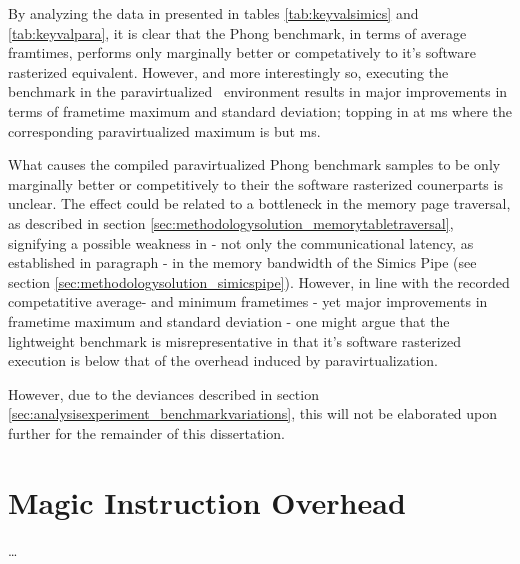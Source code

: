 
By analyzing the data in presented in tables \ref{tab:keyvalsimics} and \ref{tab:keyvalpara}, it is clear that the Phong benchmark, in terms of average framtimes, performs only marginally better or competatively to it's software rasterized equivalent.
However, and more interestingly so, executing the benchmark in the paravirtualized \dvttermsimics\ environment results in major improvements in terms of frametime maximum and standard deviation; topping in at  ms where the corresponding paravirtualized maximum is but  ms.

What causes the compiled paravirtualized Phong benchmark samples to be only marginally better or competitively to their the software rasterized counerparts is unclear.
The effect could be related to a bottleneck in the memory page traversal, as described in section \ref{sec:methodologysolution_memorytabletraversal}, signifying a possible weakness in - not only the communicational latency, as established in paragraph  - in the memory bandwidth of the Simics Pipe (see section \ref{sec:methodologysolution_simicspipe}).
However, in line with the recorded competatitive average- and minimum frametimes  - yet major improvements in frametime maximum and standard deviation - one might argue that the lightweight benchmark is misrepresentative in that it's software rasterized execution is below that of the overhead induced by paravirtualization.

However, due to the deviances described in section \ref{sec:analysisexperiment_benchmarkvariations}, this will not be elaborated upon further for the remainder of this dissertation.


\section{Magic Instruction Overhead}
\label{sec:analysisexperiment_magicinstructionoverhead}
\ldots


